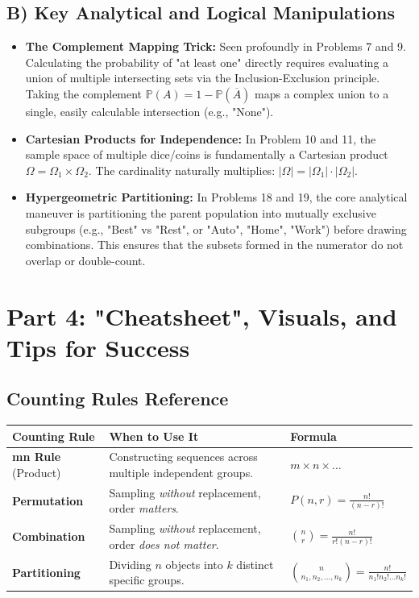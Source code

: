 \documentclass[11pt, letterpaper]{article}
\theoremstyle{definition}
\theoremstyle{remark}
\newcommand{\Prob}{\mathbb{P}}
\newcommand{\comp}[1]{\overline{#1}}
\begin{document}
\subsection{B) Key Analytical and Logical Manipulations}
\begin{itemize}
    \item \textbf{The Complement Mapping Trick:} Seen profoundly in Problems 7 and 9. Calculating the probability of "at least one" directly requires evaluating a union of multiple intersecting sets via the Inclusion-Exclusion principle. Taking the complement $\Prob(A) = 1 - \Prob(\comp{A})$ maps a complex union to a single, easily calculable intersection (e.g., "None").
    \item \textbf{Cartesian Products for Independence:} In Problem 10 and 11, the sample space of multiple dice/coins is fundamentally a Cartesian product $\Omega = \Omega_1 \times \Omega_2$. The cardinality naturally multiplies: $|\Omega| = |\Omega_1| \cdot |\Omega_2|$.
    \item \textbf{Hypergeometric Partitioning:} In Problems 18 and 19, the core analytical maneuver is partitioning the parent population into mutually exclusive subgroups (e.g., "Best" vs "Rest", or "Auto", "Home", "Work") before drawing combinations. This ensures that the subsets formed in the numerator do not overlap or double-count.
\end{itemize}

\newpage
\section{Part 4: "Cheatsheet", Visuals, and Tips for Success}

\subsection{Counting Rules Reference}
\begin{center}
\begin{tabular}{|p{3.5cm}|p{6cm}|p{5cm}|}
\hline
\textbf{Counting Rule} & \textbf{When to Use It} & \textbf{Formula} \\
\hline
\textbf{mn Rule} (Product) & Constructing sequences across multiple independent groups. & $m \times n \times \dots$ \\
\hline
\textbf{Permutation} & Sampling \textit{without} replacement, order \textit{matters}. & $P(n, r) = \frac{n!}{(n-r)!}$ \\
\hline
\textbf{Combination} & Sampling \textit{without} replacement, order \textit{does not matter}. & $\binom{n}{r} = \frac{n!}{r!(n-r)!}$ \\
\hline
\textbf{Partitioning} & Dividing $n$ objects into $k$ distinct specific groups. & $\binom{n}{n_1, n_2, \dots, n_k} = \frac{n!}{n_1! n_2! \dots n_k!}$ \\
\hline
\end{tabular}
\end{center}
\end{document}
